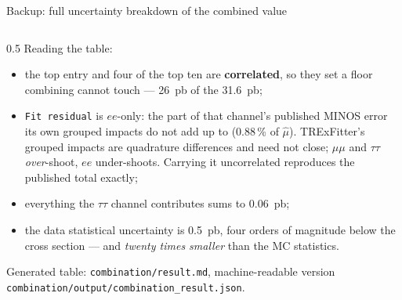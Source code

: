\documentclass[aspectratio=169,9pt,t]{beamer}
\newcommand{\src}[1]{{\scriptsize\color{gray}\texttt{#1}}}
\begin{document}
\begin{frame}[noframenumbering]{Backup: full uncertainty breakdown of the combined value}
\begin{columns}[T]
\begin{column}{0.5\textwidth}
\medskip
Reading the table:
\begin{itemize}\setlength\itemsep{2pt}
\item the top entry and four of the top ten are \textbf{correlated}, so they set a floor
      combining cannot touch --- \SI{26}{pb} of the \SI{31.6}{pb};
\item \texttt{Fit residual} is $ee$-only: the part of that channel's published MINOS error its own
      grouped impacts do not add up to (0.88\,\% of $\hat\mu$). TRExFitter's grouped impacts are
      quadrature differences and need not close; $\mu\mu$ and $\tau\tau$ \emph{over}-shoot, $ee$
      under-shoots. Carrying it uncorrelated reproduces the published total exactly;
\item everything the $\tau\tau$ channel contributes sums to \SI{0.06}{pb};
\item the data statistical uncertainty is \SI{0.5}{pb}, four orders of magnitude below the
      cross section --- and \emph{twenty times smaller} than the MC statistics.
\end{itemize}

\medskip
Generated table: \src{combination/result.md}, machine-readable version
\src{combination/output/combination\_result.json}.
\end{column}
\end{columns}
\end{frame}
\end{document}

